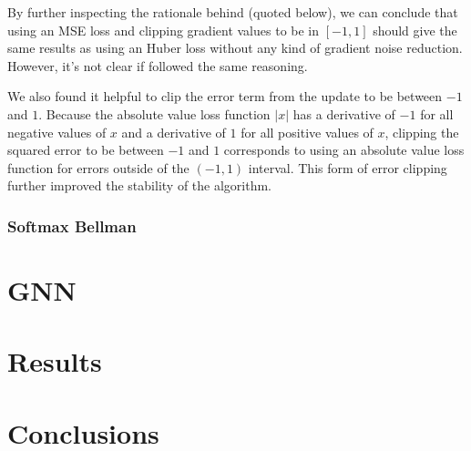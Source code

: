 \documentclass[a4paper,10pt]{report}
\begin{document}
By further inspecting the rationale behind \citeauthor{atari-dqn} (quoted below), we can conclude that using an MSE loss and clipping gradient values to be in $[-1,1]$ should give the same results as using an Huber loss without any kind of gradient noise reduction. However, it's not clear if \citeauthor{per} followed the same reasoning.
\begin{displayquote}
	We also found it helpful to clip the error term from the update to be between $−1$ and $1$. Because the absolute value loss function $|x|$ has a derivative of $−1$ for all negative values of $x$ and a derivative of $1$ for all positive values of $x$, clipping the squared error to be between $−1$ and $1$ corresponds to using an absolute value loss function for errors outside of the $(−1,1)$ interval. This form of error clipping further improved the stability of the algorithm.
\end{displayquote}

\subsection{Softmax Bellman}

\chapter{GNN}

\chapter{Results}

\chapter{Conclusions}

\printbibliography
\end{document}
